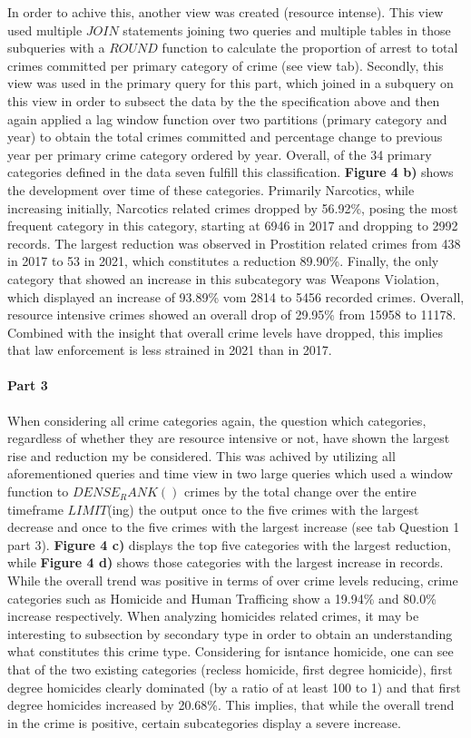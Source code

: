 \documentclass[a4paper]{article}
\begin{document}
In order to achive this, another view was created (resource intense). This view used multiple $JOIN$ statements joining two queries and multiple tables in those subqueries with a $ROUND$ function to calculate the proportion of arrest to total crimes committed per primary category of crime (see view tab). Secondly, this view was used in the primary query for this part, which joined in a subquery on this view in order to subsect the data by the the specification above and then again applied a lag window function over two partitions (primary category and year) to obtain the total crimes committed and percentage change to previous year per primary crime category ordered by year. Overall, of the 34 primary categories defined in the data seven fulfill this classification. \textbf{Figure 4 b)} shows the development over time of these categories. Primarily Narcotics, while increasing initially, Narcotics related crimes dropped by 56.92\%, posing the most frequent category in this category, starting at 6946 in 2017 and dropping to 2992 records. The largest reduction was observed in Prostition related crimes from 438 in 2017 to 53 in 2021, which constitutes a reduction 89.90\%. Finally, the only category that showed an increase in this subcategory was Weapons Violation, which displayed an increase of 93.89\% vom 2814 to 5456 recorded crimes. Overall, resource intensive crimes showed an overall drop of 29.95\% from 15958 to 11178. Combined with the insight that overall crime levels have dropped, this implies that law enforcement is less strained in 2021 than in 2017. 



\paragraph{Part 3} When considering all crime categories again, the question which categories, regardless of whether they are resource intensive or not, have shown the largest rise and reduction my be considered. This was achived by utilizing all aforementioned queries and time view in two large queries which used a window function to $DENSE_RANK()$ crimes by the total change over the entire timeframe $LIMIT$(ing) the output once to the five crimes with the largest decrease and once to the five crimes with the largest increase (see tab Question 1 part 3). \textbf{Figure 4 c)} displays the top five categories with the largest reduction, while \textbf{Figure 4 d)} shows those categories with the largest increase in records. While the overall trend was positive in terms of over crime levels reducing, crime categories such as Homicide and Human Trafficing show a 19.94\% and 80.0\% increase respectively. When analyzing homicides related crimes, it may be interesting to subsection by secondary type in order to obtain an understanding what constitutes this crime type. Considering for isntance homicide, one can see that of the two existing categories (recless homicide, first degree homicide), first degree homicides clearly dominated (by a ratio of at least 100 to 1) and that first degree homicides increased by 20.68\%. This implies, that while the overall trend in the crime is positive, certain subcategories display a severe increase.  
\end{document}
